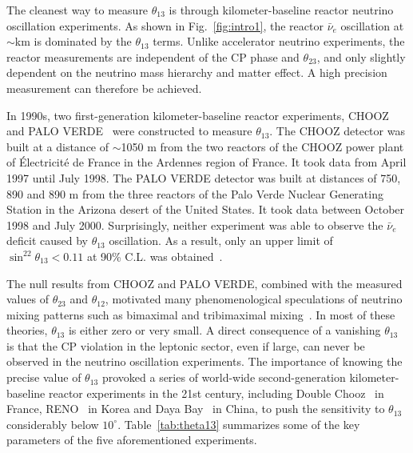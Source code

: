 \documentclass[aps,twocolumn,preprintnumbers,amsmath,superscriptaddress,amssymb,floats,nofootinbib]{revtex4-1}
\begin{document}
The cleanest way to measure $\theta_{13}$ is through kilometer-baseline reactor neutrino oscillation experiments. As shown in Fig.~\ref{fig:intro1}, the reactor $\bar\nu_e$ oscillation at $\sim$km is dominated by the $\theta_{13}$ terms. Unlike accelerator neutrino experiments, the reactor measurements are independent of the CP phase and $\theta_{23}$, and only slightly dependent on the neutrino mass hierarchy and matter effect. A high precision measurement can therefore be achieved.

In 1990s, two first-generation kilometer-baseline reactor experiments, CHOOZ~\cite{Chooz} and PALO VERDE~\cite{Paloverde} were constructed to measure $\theta_{13}$. 
The CHOOZ detector was built at a distance of $\sim$1050 m from the two reactors of the CHOOZ power plant of \'{E}lectricit\'e de France in the Ardennes region of France. It took data from April 1997 until July 1998. 
The PALO VERDE detector was built at distances of 750, 890 and 890 m from the three reactors of the Palo Verde Nuclear Generating Station in the Arizona desert of the United States. It took data between October 1998 and July 2000. 
Surprisingly, neither experiment was able to observe the $\bar\nu_e$ deficit caused by $\theta_{13}$ oscillation. 
As a result, only an upper limit of $\sin^22\theta_{13} < 0.11$ at 90\% C.L. was obtained~\cite{Chooz}.

The null results from CHOOZ and PALO VERDE, combined with the measured values of $\theta_{23}$ and $\theta_{12}$, motivated many phenomenological speculations of neutrino mixing patterns such as bimaximal and tribimaximal mixing~\cite{Harrison,Altarelli}. 
In most of these theories, $\theta_{13}$ is either zero or very small. 
A direct consequence of a vanishing $\theta_{13}$ is that the CP violation in the leptonic sector, even if large, can never be observed in the neutrino oscillation experiments. 
The importance of knowing the precise value of $\theta_{13}$ provoked a series of world-wide second-generation kilometer-baseline reactor experiments in the 21st century, including Double Chooz~\cite{DChooz} in France, RENO~\cite{Reno} in Korea and Daya Bay~\cite{Dayabay} in China, to push the sensitivity to $\theta_{13}$ considerably below $10^\circ$. 
Table~\ref{tab:theta13} summarizes some of the key parameters of the five aforementioned experiments.
\end{document}
